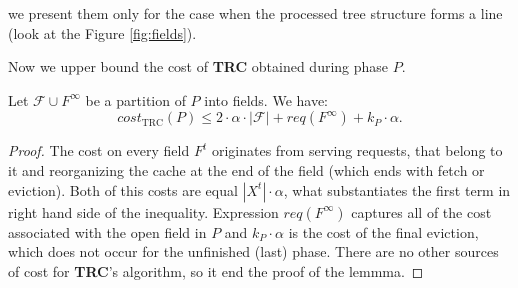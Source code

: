 we present them only for the case when the processed tree structure forms a line
(look at the Figure \ref{fig:fields}).

Now we upper bound the cost of \textbf{TRC} obtained during phase $P$.
\begin{lemma} Let $\mathcal{F} \cup F^{\infty}$ be a partition of $P$ into
fields. We have: $$cost_{\mathrm{TRC}}(P) \leq 2 \cdot \alpha \cdot
|\mathcal{F}| + req(F^{\infty}) + k_P \cdot \alpha.$$ \label{thm:trc_cost}
\end{lemma} \begin{proof} The cost on every field $F^t$ originates from serving
requests, that belong to it and reorganizing the cache at the end of the field
(which ends with fetch or eviction). Both of this costs are equal $|X^t| \cdot
\alpha$, what substantiates the first term in right hand side of the inequality.
Expression $req(F^{\infty})$ captures all of the cost associated with the open
field in $P$ and $k_P \cdot \alpha$ is the cost of the final eviction, which
does not occur for the unfinished (last) phase. There are no other sources of
cost for \textbf{TRC}'s algorithm, so it end the proof of the lemmma.
\end{proof}

